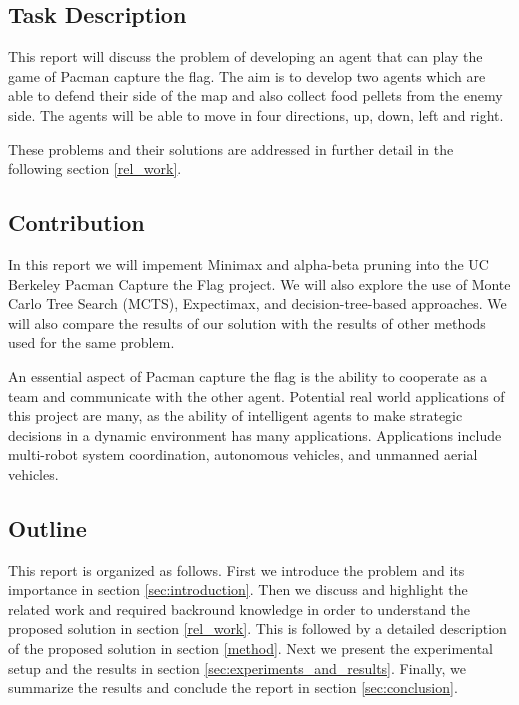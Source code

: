 \documentclass[a4paper,12pt]{article}
\begin{document}
\subsection{Task Description}

This report will discuss the problem of developing an agent that can play the game of Pacman capture the flag. 
The aim is to develop two agents which are able to defend their side of the map and also collect food pellets from the enemy side. 
The agents will be able to move in four directions, up, down, left and right. 




These problems and their solutions are addressed in further detail in the following section \ref{rel_work}.




\subsection{Contribution}

In this report we will impement Minimax and alpha-beta pruning into the UC Berkeley Pacman Capture the Flag project. We will also explore the use of Monte Carlo Tree Search (MCTS), Expectimax, and decision-tree-based approaches.
We will also compare the results of our solution with the results of other methods used for the same problem.

An essential aspect of Pacman capture the flag is the ability to cooperate as a team and communicate with the other agent. 
Potential real world applications of this project are many, as the ability of intelligent agents to make strategic decisions in a dynamic environment has many applications. 
Applications include multi-robot system coordination, autonomous vehicles, and unmanned aerial vehicles.







\subsection{Outline}
This report is organized as follows. First we introduce the problem and its importance in section \ref{sec:introduction}. 
Then we discuss and highlight the related work and required backround knowledge in order to understand the proposed solution in section \ref{rel_work}.
This is followed by a detailed description of the proposed solution in section \ref{method}.
Next we present the experimental setup and the results in section \ref{sec:experiments_and_results}.
Finally, we summarize the results and conclude the report in section \ref{sec:conclusion}.
\end{document}
